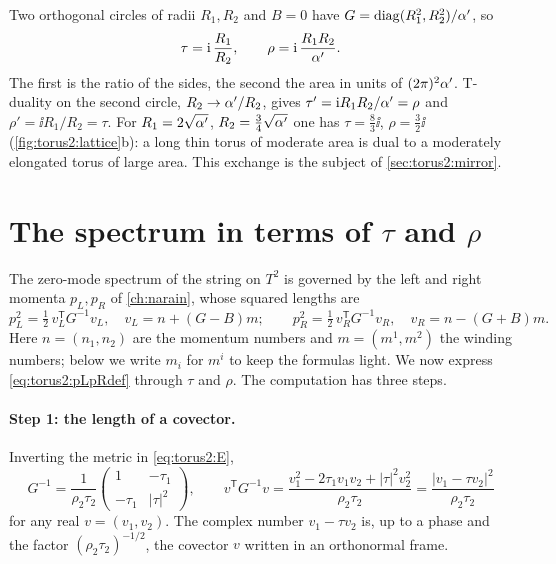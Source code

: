 \begin{example}\label{ex:torus2:rect}
Two orthogonal circles of radii $R_1,R_2$ and $B=0$ have $G=\operatorname{diag}(R_1^2,R_2^2)/\alpha'$, so
\begin{equation}\label{eq:torus2:rect}
 \tau=\mathrm{i}\,\frac{R_1}{R_2},\qquad \rho=\mathrm{i}\,\frac{R_1R_2}{\alpha'}.
\end{equation}
The first is the ratio of the sides, the second the area in units of $(2\pi)^2\alpha'$.
T-duality on the second circle, $R_2\to\alpha'/R_2$, gives $\tau'=\mathrm{i} R_1R_2/\alpha'=\rho$ and
$\rho'=\ii R_1/R_2=\tau$. For $R_1=2\sqrt{\alpha'}$, $R_2=\frac34\sqrt{\alpha'}$ one has
$\tau=\frac83\ii$, $\rho=\frac32\ii$ (\cref{fig:torus2:lattice}b): a long thin torus of
moderate area is dual to a moderately elongated torus of large area. This exchange is the
subject of \cref{sec:torus2:mirror}.
\end{example}

\section{The spectrum in terms of \texorpdfstring{$\tau$}{tau} and
\texorpdfstring{$\rho$}{rho}}\label{sec:torus2:spectrum}

The zero-mode spectrum of the string on $T^2$ is governed by the left and right momenta
$p_L,p_R$ of \cref{ch:narain}, whose squared lengths are
\begin{equation}\label{eq:torus2:pLpRdef}
 p_L^2=\tfrac12\,v_L^{\mathsf T}G^{-1}v_L,\quad v_L=n+(G-B)m;\qquad
 p_R^2=\tfrac12\,v_R^{\mathsf T}G^{-1}v_R,\quad v_R=n-(G+B)m .
\end{equation}
Here $n=(n_1,n_2)$ are the momentum numbers and $m=(m^1,m^2)$ the winding numbers; below we
write $m_i$ for $m^i$ to keep the formulas light. We now express \eqref{eq:torus2:pLpRdef}
through $\tau$ and $\rho$. The computation has three steps.

\paragraph{Step 1: the length of a covector.} Inverting the metric in \eqref{eq:torus2:E},
\[
 G^{-1}=\frac1{\rho_2\tau_2}\begin{pmatrix}1&-\tau_1\\-\tau_1&|\tau|^2\end{pmatrix},
 \qquad
 v^{\mathsf T}G^{-1}v=\frac{v_1^2-2\tau_1v_1v_2+|\tau|^2v_2^2}{\rho_2\tau_2}
 =\frac{|v_1-\tau v_2|^2}{\rho_2\tau_2}
\]
for any real $v=(v_1,v_2)$. The complex number $v_1-\tau v_2$ is, up to a phase and the
factor $(\rho_2\tau_2)^{-1/2}$, the covector $v$ written in an orthonormal frame.


